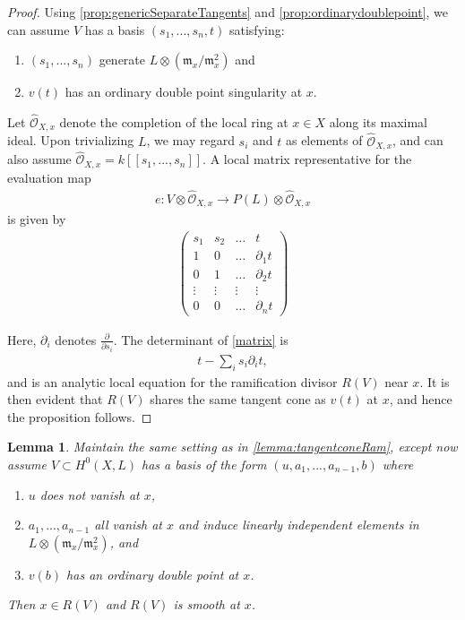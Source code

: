 \documentclass[11pt,reqno]{amsart}
\theoremstyle{plain}
\newtheorem{lemma}[theorem]{Lemma}
\theoremstyle{definition}
\theoremstyle{remark}
\numberwithin{equation}{section}
\renewcommand{\to}{{\longrightarrow}}
\numberwithin{equation}{section}
\renewcommand{\O}{\mathcal O}
\begin{document}
\begin{proof}
  Using \autoref{prop:genericSeparateTangents} and \autoref{prop:ordinarydoublepoint}, we can assume $V$ has a basis $(s_{1}, ..., s_{n}, t)$ satisfying: 
  \begin{enumerate}
      \item $(s_{1}, ..., s_{n})$ generate $L \otimes ({\mathfrak m}_{x}/{\mathfrak m}^{2}_{x})$ and
      \item $v(t)$ has an ordinary double point singularity at $x$.
    \end{enumerate}  

Let $\widehat{\O}_{X,x}$ denote the completion of the local ring at $x \in X$ along its maximal ideal.  Upon trivializing $L$, we may regard $s_{i}$ and $t$ as elements of $\widehat{\O}_{X,x}$, and can also assume  $\widehat{\O}_{X,x} = k[[s_{1}, ..., s_{n}]]$. A local matrix representative for the evaluation map 
\begin{align*}
  e: V \otimes \widehat{\O}_{X,x} \to P(L) \otimes \widehat{\O}_{X,x}
\end{align*}
is given by 
\begin{align}\label{matrix}
\begin{pmatrix}
  s_{1} & s_{2} & \dots & t \\
  1 & 0 & \dots & \partial_{1}t \\
  0 & 1 & \dots & \partial_{2}t \\
  \vdots & \vdots & \vdots & \vdots \\
  0 & 0 & \dots & \partial_{n}t
\end{pmatrix}
\end{align}

Here, $\partial_{i}$ denotes $\frac{\partial}{\partial s_{i}}$. The determinant of \ref{matrix} is 
\begin{align*}
  t - \sum_{i}s_{i}\partial_{i}t,
\end{align*}
and is an analytic local equation for the ramification divisor $R(V)$ near $x$.  It is then evident that $R(V)$ shares the same tangent cone as $v(t)$ at $x$, and hence the proposition follows.
\end{proof}

\begin{lemma}\label{lemma:basepointfree}
  Maintain the same setting as in \autoref{lemma:tangentconeRam}, except now assume $V \subset H^{0}(X,L)$ has a basis of the form $(u,a_{1}, ..., a_{n-1}, b)$ where 
  \begin{enumerate}
    \item $u$ does not vanish at $x$,
    \item $a_{1}, ..., a_{n-1}$ all vanish at $x$ and induce linearly independent elements in $L \otimes ({\mathfrak m}_{x}/{\mathfrak m}^{2}_{x})$, and
    \item $v(b)$ has an ordinary double point at $x$. 
  \end{enumerate}
  Then $x \in R(V)$ and $R(V)$ is smooth at $x$.
\end{lemma}
\end{document}
